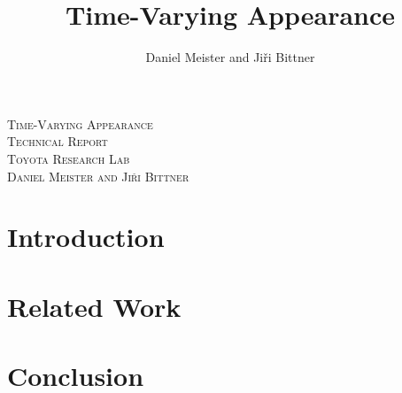 \documentclass[11pt]{article}
\author{Daniel Meister and Ji\v{r}i Bittner}
\title{Time-Varying Appearance}
\begin{document}
\begin{center}
\textsc{\LARGE Time-Varying Appearance}\\[0.4cm]
\textsc{\Large Technical Report}\\[0.4cm]
\textsc{\large Toyota Research Lab}\\[0.4cm]
\textsc{\normalsize Daniel Meister and Ji\v{r}i Bittner}\\[0.5cm]
\end{center}

\section{Introduction}

\section{Related Work}

\section{Conclusion}

\vspace{3.0cm}



\end{document}

